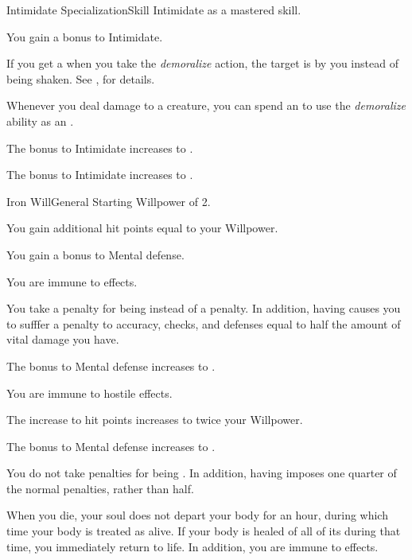     \begin{feat}{Intimidate Specialization}{Skill}
        \featpre Intimidate as a mastered skill.
        \featben

         You gain a  bonus to Intimidate.

         If you get a  when you take the \textit{demoralize} action, the target is \frightened by you instead of being shaken.
        See , for details.

         Whenever you deal damage to a creature, you can spend an  to use the \textit{demoralize} ability as an .

         The bonus to Intimidate increases to .

         The bonus to Intimidate increases to .
    \end{feat}

    \begin{feat}{Iron Will}{General}
        \featpre Starting Willpower of 2.
        \featben

         You gain additional hit points equal to your Willpower.

         You gain a  bonus to Mental defense.

         You are immune to  effects.

         You take a  penalty for being  instead of a  penalty.
        In addition, having  causes you to sufffer a penalty to accuracy, checks, and defenses equal to half the amount of vital damage you have.

         The bonus to Mental defense increases to .

         You are immune to hostile  effects.

         The increase to hit points increases to twice your Willpower.

         The bonus to Mental defense increases to .

         You do not take penalties for being .
        In addition, having  imposes one quarter of the normal penalties, rather than half.

         When you die, your soul does not depart your body for an hour, during which time your body is treated as alive.
        If your body is healed of all of its  during that time, you immediately return to life.
        In addition, you are immune to  effects.
    \end{feat}

